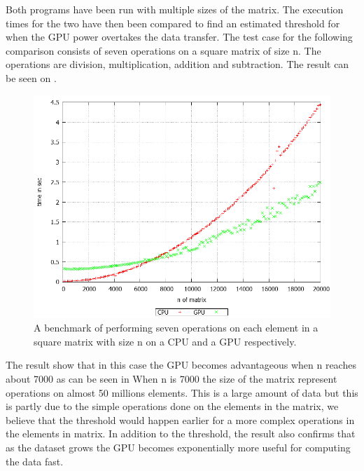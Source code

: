 Both programs have been run with multiple sizes of the matrix.
The execution times for the two have then been compared to find an estimated threshold for when the GPU power overtakes the data transfer.
The test case for the following comparison consists of seven operations on a square matrix of size n.
The operations are division, multiplication, addition and subtraction.
The result can be seen on .
\begin{figure}[h!]
\centering
 \includegraphics[width=1\textwidth]{figures/benchmark.png} %
\caption{A benchmark of performing seven operations on each element in a square matrix with size n on a CPU and a GPU respectively.}\label{image:benchmark}
\vspace{-15pt}
\end{figure}

The result show that in this case the GPU becomes advantageous when n reaches about 7000 as can be seen in 
When n is 7000 the size of the matrix represent operations on almost 50 millions elements.
This is a large amount of data but this is partly due to the simple operations done on the elements in the matrix, we believe that the threshold would happen earlier for a more complex operations in the elements in matrix.
In addition to the threshold, the result also confirms that as the dataset grows the GPU becomes exponentially more useful for computing the data fast.
